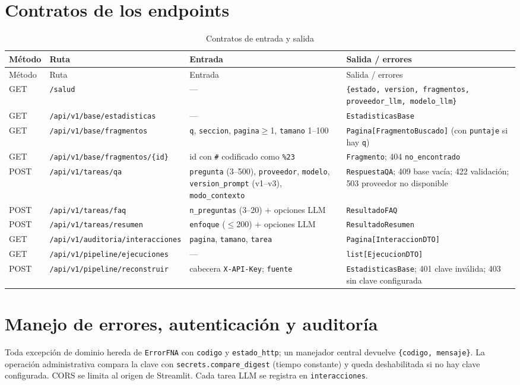 \section{Contratos de los endpoints}
\begin{longtable}{@{}P{1.1cm}P{4.3cm}P{4.4cm}P{5.4cm}@{}}
\caption{Contratos de entrada y salida}\label{tab:endpoints}\\\toprule
Método & Ruta & Entrada & Salida / errores\\\midrule\endfirsthead
\toprule Método & Ruta & Entrada & Salida / errores\\\midrule\endhead
GET & \texttt{/salud} & --- & \texttt{\{estado, version, fragmentos, proveedor\_llm, modelo\_llm\}}\\
GET & \texttt{/api/v1/base/estadisticas} & --- & \texttt{EstadisticasBase}\\
GET & \texttt{/api/v1/base/fragmentos} & \texttt{q}, \texttt{seccion}, \texttt{pagina}$\geq$1, \texttt{tamano} 1--100 &
\texttt{Pagina[FragmentoBuscado]} (con \texttt{puntaje} si hay \texttt{q})\\
GET & \texttt{/api/v1/base/fragmentos/\{id\}} & id con \texttt{\#} codificado como \texttt{\%23} & \texttt{Fragmento}; 404 \texttt{no\_encontrado}\\
POST & \texttt{/api/v1/tareas/qa} & \texttt{pregunta} (3--500), \texttt{proveedor}, \texttt{modelo}, \texttt{version\_prompt} (v1--v3),
\texttt{modo\_contexto} & \texttt{RespuestaQA}; 409 base vacía; 422 validación; 503 proveedor no disponible\\
POST & \texttt{/api/v1/tareas/faq} & \texttt{n\_preguntas} (3--20) + opciones LLM & \texttt{ResultadoFAQ}\\
POST & \texttt{/api/v1/tareas/resumen} & \texttt{enfoque} ($\leq$200) + opciones LLM & \texttt{ResultadoResumen}\\
GET & \texttt{/api/v1/auditoria/interacciones} & \texttt{pagina}, \texttt{tamano}, \texttt{tarea} & \texttt{Pagina[InteraccionDTO]}\\
GET & \texttt{/api/v1/pipeline/ejecuciones} & --- & \texttt{list[EjecucionDTO]}\\
POST & \texttt{/api/v1/pipeline/reconstruir} & cabecera \texttt{X-API-Key}; \texttt{fuente} & \texttt{EstadisticasBase}; 401 clave inválida; 403 sin clave configurada\\\bottomrule
\end{longtable}

\section{Manejo de errores, autenticación y auditoría}
Toda excepción de dominio hereda de \texttt{ErrorFNA} con \texttt{codigo} y \texttt{estado\_http}; un manejador
central devuelve \texttt{\{codigo, mensaje\}}. La operación administrativa compara la clave con
\texttt{secrets.compare\_digest} (tiempo constante) y queda deshabilitada si no hay clave configurada. CORS se
limita al origen de Streamlit. Cada tarea LLM se registra en \texttt{interacciones}.

